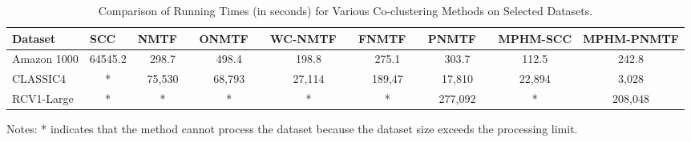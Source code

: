 \documentclass[journal]{IEEEtran}
\renewcommand{\cite}[1]{~\autocite{#1}}
\begin{document}
\begin{table}[htbp]
  \centering
  \caption{Comparison of Running Times (in seconds) for Various Co-clustering Methods on Selected Datasets.}
  \label{tab:running-time}
  \begin{tabular}{@{} l cccccccc @{}}
    \toprule
    Dataset     & SCC \cite{dhillon2001CoclusteringDocumentsWords}
                & NMTF \cite{long2005CoclusteringBlockValue}
                & ONMTF \cite{ding2006OrthogonalNonnegativeMatrix}
                & WC-NMTF \cite{salah2018WordCooccurrenceRegularized}
                & FNMTF \cite{kim2011FastNonnegativeMatrix}
                & PNMTF \cite{chen2023ParallelNonNegativeMatrix}      & \textbf{MPHM-SCC} & \textbf{MPHM-PNMTF}                                                \\
    \midrule
    Amazon 1000 & 64545.2                                             & 298.7             & 498.4               & 198.8  & 275.1  & 303.7   & 112.5  & 242.8   \\
    CLASSIC4    & *                                                   & 75,530            & 68,793              & 27,114 & 189,47 & 17,810  & 22,894 & 3,028   \\
    RCV1-Large  & *                                                   & *                 & *                   & *      & *      & 277,092 & *      & 208,048 \\
    \bottomrule
  \end{tabular}
  \begin{tablenotes}
    \small
    \item Notes: * indicates that the method cannot process the dataset because the dataset size exceeds the processing limit.
  \end{tablenotes}
\end{table}
\end{document}
